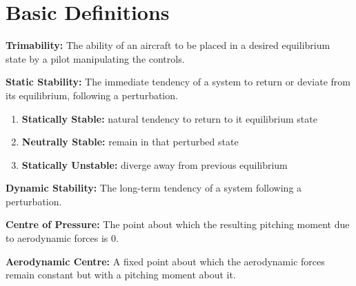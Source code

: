 \section{Basic Definitions}
\textbf{Trimability:} The ability of an aircraft to be placed in a desired equilibrium state by a pilot manipulating the controls.

\textbf{Static Stability:} The immediate tendency of a system to return or deviate from its equilibrium, following a perturbation.
\begin{enumerate}
  \item \textbf{Statically Stable:} natural tendency to return to it equilibrium state
  \item \textbf{Neutrally Stable:} remain in that perturbed state
  \item \textbf{Statically Unstable:} diverge away from previous equilibrium
\end{enumerate}

\textbf{Dynamic Stability:} The long-term tendency of a system following a perturbation.

\textbf{Centre of Pressure:} The point about which the resulting pitching moment due to aerodynamic forces is 0.

\textbf{Aerodynamic Centre:} A fixed point about which the aerodynamic forces remain constant but with a pitching moment about it.
